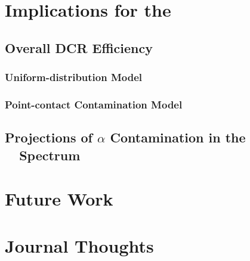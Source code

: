 \documentclass[groupedaddress,rmp,amsmath,amssymb,bibnotes,altaffilletter,twocolumn]{revtex4-1}
\begin{document}
\section{Implications for the \MJ\ \DEM\ }
\subsection{Overall DCR Efficiency}
\subsubsection{Uniform-distribution Model}
\subsubsection{Point-contact Contamination Model}

\subsection{Projections of $\alpha$ Contamination in the \MJ\ \DEM\ Spectrum}

\section{Future Work}



\section{Journal Thoughts}





\end{document}
